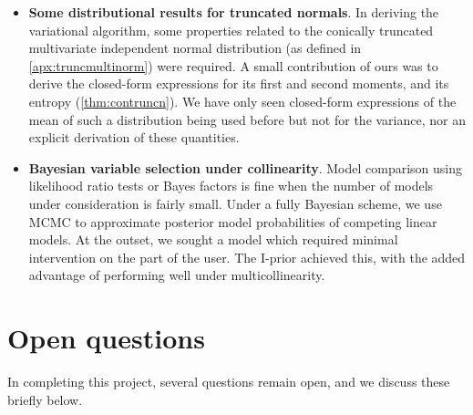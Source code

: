 \documentclass[a4paper,showframe,11pt]{report}
\begin{document}
\begin{itemize}
  \item \textbf{Some distributional results for truncated normals}. 
  In deriving the variational algorithm, some properties related to the conically truncated multivariate independent normal distribution (as defined in \cref{apx:truncmultinorm}) were required.
  A small contribution of ours was to derive the closed-form expressions for its first and second moments, and its entropy (\cref{thm:contruncn}).
  We have only seen closed-form expressions of the mean of such a distribution being used before \citep{girolami2006variational} but not for the variance, nor an explicit derivation of these quantities.
    
  \item \textbf{Bayesian variable selection under collinearity}. 
  Model comparison using likelihood ratio tests or Bayes factors is fine when the number of models under consideration is fairly small.
  Under a fully Bayesian scheme, we use MCMC to approximate posterior model probabilities of competing linear models.
  At the outset, we sought a model which required minimal intervention on the part of the user.
  The I-prior achieved this, with the added advantage of performing well under multicollinearity.
  
\end{itemize}

\section{Open questions}

In completing this project, several questions remain open, and we discuss these briefly below.
\end{document}
